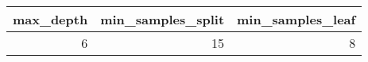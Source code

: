 \begin{tabular}{rrr}
\toprule
max_depth & min_samples_split & min_samples_leaf \\
\midrule
6 & 15 & 8 \\
\bottomrule
\end{tabular}
